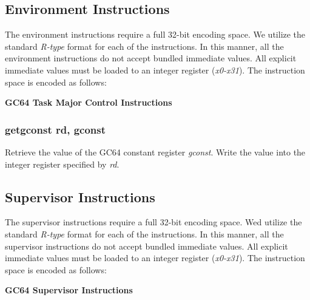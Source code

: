 \documentclass{article}
\begin{document}
\subsection{Environment Instructions}

The environment instructions require a full 32-bit encoding space.  We utilize 
the standard \emph{R-type} format for each of the instructions.  In this manner, 
all the environment instructions do not accept bundled immediate values.  All
explicit immediate values must be loaded to an integer register (\emph{x0-x31}).  
The instruction space is encoded as follows: 

\begin{center}
\textbf{GC64 Task Major Control Instructions}
\makebox[0.03in][s]{}\makebox[0.03in][s]{}\makebox[0.03in][s]{}\makebox[0.03in][s]{}\makebox[0.03in][s]{}
\end{center}

\subsubsection{getgconst rd, gconst}

Retrieve the value of the GC64 constant register \emph{gconst}.  Write
the value into the integer register specified by \emph{rd}.

\subsection{Supervisor Instructions}

The supervisor instructions require a full 32-bit encoding space.  Wed utilize
the standard \emph{R-type} format for each of the instructions.  In this manner, 
all the supervisor instructions do not accept bundled immediate values.  All
explicit immediate values must be loaded to an integer register (\emph{x0-x31}).
The instruction space is encoded as follows: 

\begin{center}
\textbf{GC64 Supervisor Instructions}
\makebox[0.03in][s]{}\makebox[0.03in][s]{}\makebox[0.03in][s]{}\makebox[0.03in][s]{}\makebox[0.03in][s]{}
\end{center}
\end{document}
